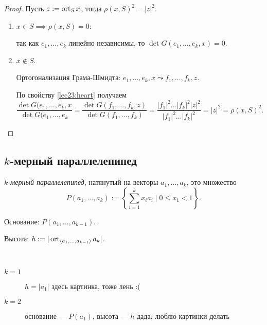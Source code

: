 \begin{proof}
    Пусть $z := \operatorname{\mathop{\mathrm{ort}}}_S x$, тогда $\rho(x, S)^2 = |z|^2$.

    \begin{enumerate}
    \item $x \in S \implies \rho(x, S) = 0$:

        так как $e_1, \dots, e_k$ линейно независимы, то $\det G(e_1, \dots, e_k, x) = 0$.

    \item $x \not\in S$.

        Ортогонализация Грама-Шмидта: $e_1, \dots, e_k, x \leadsto f_1, \dots, f_k, z$.

        По свойству \ref{lec23:heart} получаем
        \begin{equation*}
            \dfrac{\det G(e_1, \dots, e_k, x}{\det G(e_1, \dots, e_k} = \dfrac{\det G(f_1, \dots, f_k, z)}{\det G(f_1, \dots, f_k)} = \frac{|f_1|^2 \dots |f_k|^2 |z|^2}{|f_1|^2 \dots |f_k|^2} = |z|^2 = \rho(x, S)^2
        .\end{equation*}
    \end{enumerate}
\end{proof}


\subsection{$k$-мерный параллелепипед}

\begin{definition}
    \textit{$k$-мерный параллелепипед}, натянутый на векторы $a_1, \dots, a_k$, это множество
    \begin{equation*}
        P(a_1, \dots, a_k) := \left\{ \sum_{i = 1}^{k} x_i a_i \mid 0 \leq x_1 < 1 \right\}
    .\end{equation*}

    Основание: $P(a_1, \dots, a_{k - 1})$.

    Высота: $h := |\operatorname{\mathop{\mathrm{ort}}}_{\left< a_1, \dots, a_{k - 1} \right>} a_k|$.
\end{definition}

\begin{example}~
    \begin{description}
    \item[$k = 1$] $h = |a_1|$ {\tiny здесь картинка, тоже лень :(}
    \item[$k = 2$] основание --- $P(a_1)$, высота --- $h$ {\tiny дада, люблю картинки делать}
    \end{description}
\end{example}


